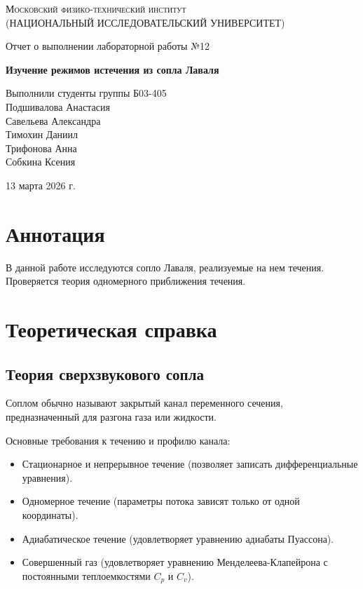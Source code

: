 \documentclass[12pt,a4paper]{article}
\def \TITLE {Отчет о выполнении лабораторной работы №12}
\def \SUBTITLE {Изучение режимов истечения из сопла Лаваля}
\def \AUTHOR {Выполнили студенты группы Б03-405\\Подшивалова Анастасия\\Савельева Александра\\Тимохин Даниил\\Трифонова Анна\\Собкина Ксения}
\def \DATE {13 марта 2026 г.}
\begin{document}
\begin{titlepage}
	\centering
	\vspace{5cm}
	{\scshape\large Московский физико-технический институт \\
	(НАЦИОНАЛЬНЫЙ ИССЛЕДОВАТЕЛЬСКИЙ УНИВЕРСИТЕТ)}
	
	\vspace{4cm}
	{\LARGE \TITLE}
	
	\vspace{1cm}
	{\Huge\bf \SUBTITLE }
	
	\vspace{1cm}
	\vfill
	
\begin{flushright}
	{\LARGE \AUTHOR}
\end{flushright}
	

	\vfill

	\DATE
\end{titlepage}

\newpage

\fontsize{12}{14}\selectfont

\section{ Аннотация}
В данной работе исследуются сопло Лаваля, реализуемые на нем течения. Проверяется теория одномерного приближения течения.

\section{ Теоретическая справка}

\subsection{Теория сверхзвукового сопла}

Соплом обычно называют закрытый канал переменного сечения, предназначенный для разгона газа или жидкости.

Основные требования к течению и профилю канала:
\begin{itemize}
	\item Стационарное и непрерывное течение (позволяет записать дифференциальные уравнения).
	\item Одномерное течение (параметры потока зависят только от одной координаты).
	\item Адиабатическое течение (удовлетворяет уравнению адиабаты Пуассона).
	\item Совершенный газ (удовлетворяет уравнению Менделеева-Клапейрона с постоянными теплоемкостями \(C_p\) и \(C_v\)).
\end{itemize}
\end{document}
